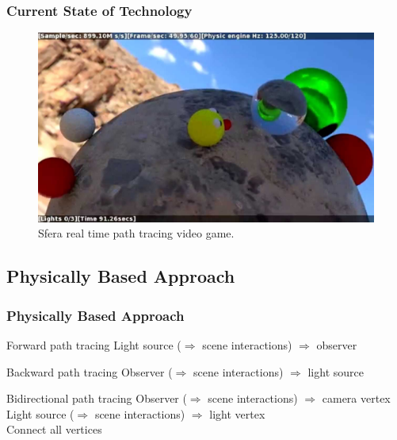 \documentclass{beamer}
\begin{document}
\begin{frame}
    \frametitle{Current State of Technology}
    \begin{figure}[H]
        \includegraphics[scale=0.2]{sfera}
        \centering
        \caption{Sfera real time path tracing video game.}
    \end{figure}
\end{frame}

\subsection{Physically Based Approach}
\begin{frame}
    \frametitle{Physically Based Approach}
    \begin{block}{Forward path tracing}
        Light source (\(\Rightarrow\) scene interactions) \(\Rightarrow\) observer
    \end{block}
    \begin{block}{Backward path tracing}
        Observer (\(\Rightarrow\) scene interactions) \(\Rightarrow\) light source
    \end{block}
    \begin{block}{Bidirectional path tracing}
        Observer (\(\Rightarrow\) scene interactions) \(\Rightarrow\) camera vertex\\
        Light source (\(\Rightarrow\) scene interactions) \(\Rightarrow\) light vertex\\
        Connect all vertices
    \end{block}
\end{frame}
\end{document}
